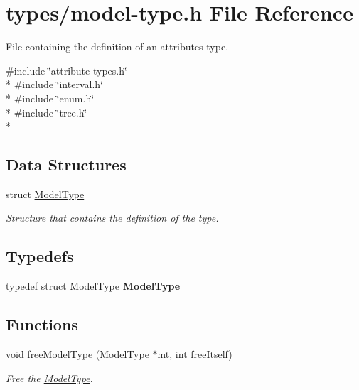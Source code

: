 \hypertarget{model-type_8h}{}\section{types/model-\/type.h File Reference}
\label{model-type_8h}


File containing the definition of an attribute\textquotesingle{}s type.  


{\ttfamily \#include \char`\"{}attribute-\/types.\+h\char`\"{}}\\*
{\ttfamily \#include \char`\"{}interval.\+h\char`\"{}}\\*
{\ttfamily \#include \char`\"{}enum.\+h\char`\"{}}\\*
{\ttfamily \#include \char`\"{}tree.\+h\char`\"{}}\\*
\subsection*{Data Structures}
\begin{DoxyCompactItemize}
\item 
struct \hyperlink{struct_model_type}{Model\+Type}
\begin{DoxyCompactList}\small\item\em Structure that contains the definition of the type. \end{DoxyCompactList}\end{DoxyCompactItemize}
\subsection*{Typedefs}
\begin{DoxyCompactItemize}
\item 
typedef struct \hyperlink{struct_model_type}{Model\+Type} {\bfseries Model\+Type}\hypertarget{model-type_8h_a461663496a22a2e5708b7cbd2cf2e643}{}\label{model-type_8h_a461663496a22a2e5708b7cbd2cf2e643}

\end{DoxyCompactItemize}
\subsection*{Functions}
\begin{DoxyCompactItemize}
\item 
void \hyperlink{model-type_8h_ad4abcd53e26c93d68af7c0944d506fb9}{free\+Model\+Type} (\hyperlink{struct_model_type}{Model\+Type} $\ast$mt, int free\+Itself)
\begin{DoxyCompactList}\small\item\em Free the \hyperlink{struct_model_type}{Model\+Type}. \end{DoxyCompactList}\end{DoxyCompactItemize}


